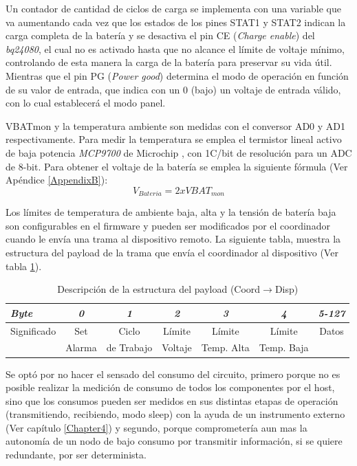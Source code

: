 {Un contador de cantidad de ciclos de carga se implementa con una variable que va aumentando cada vez que los estados de los pines STAT1 y STAT2 indican la carga completa de la batería y se desactiva el pin CE (\textit{Charge enable}) del \textit{bq24080}, el cual no es activado hasta que no alcance el límite de voltaje mínimo, controlando de esta manera la carga de la batería para preservar su vida útil. Mientras que el pin PG (\textit{Power good}) determina el modo de operación en función de su valor de entrada, que indica con un 0 (bajo) un voltaje de entrada válido, con lo cual establecerá el modo panel. 

VBATmon y la temperatura ambiente son medidas con el conversor AD0 y AD1 respectivamente. Para medir la temperatura se emplea el termistor lineal activo de baja potencia \textit{MCP9700} de Microchip \citep{termis}, con 1\grados C/bit de resolución para un ADC de 8-bit. Para obtener el voltaje de la batería se emplea la siguiente fórmula (Ver Apéndice \ref{AppendixB}): \[V_{Bateria}=2xVBAT_{mon}\]

Los límites de temperatura de ambiente baja, alta y la tensión de batería baja son configurables en el firmware y pueden ser modificados por el coordinador cuando le envía una trama al dispositivo remoto. La siguiente tabla, muestra la estructura del payload de la trama que envía el coordinador al dispositivo (Ver tabla \ref{tab:coordisp}).

\begin{table}[ht]
	\centering
	\caption{Descripción de la estructura del payload (Coord$\rightarrow$Disp)}
	\begin{tabular}{@{} l *6c @{}}    \toprule
		\emph{\textbf{Byte}} & \emph{\textbf{0}} & \emph{\textbf{1}} & \emph{\textbf{2}} & \emph{\textbf{3}} & \emph{\textbf{4}} & \emph{\textbf{5-127}}\\
		\midrule
		Significado & Set & Ciclo & Límite & Límite & Límite & Datos\\
		 & Alarma & de Trabajo & Voltaje & Temp. Alta & Temp. Baja & \\
		\bottomrule
		\hline
	\end{tabular}
	\label{tab:coordisp}
\end{table}

Se optó por no hacer el sensado del consumo del circuito, primero porque no es posible realizar la medición de consumo de todos los componentes por el host, sino que los consumos pueden ser medidos en sus distintas etapas de operación (transmitiendo, recibiendo, modo sleep) con la ayuda de un instrumento externo (Ver capítulo \ref{Chapter4}) y segundo, porque comprometería aun mas la autonomía de un nodo de bajo consumo por transmitir información, si se quiere redundante, por ser determinista.

}
